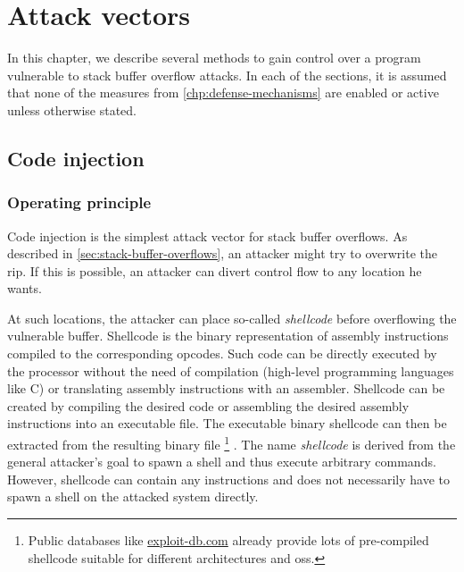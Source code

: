 \chapter{Attack vectors}
\label{chp:attack-vectors}

In this chapter, we describe several methods to gain control over a program vulnerable to stack buffer overflow attacks.
In each of the sections, it is assumed that none of the measures from \cref{chp:defense-mechanisms} are enabled or active unless otherwise stated.


\section{Code injection}
\label{sec:code-injection}

\subsection{Operating principle}
\label{subsec:ci-operating-principle}

Code injection is the simplest attack vector for stack buffer overflows.
As described in \cref{sec:stack-buffer-overflows}, an attacker might try to overwrite the \gls{rip}.
If this is possible, an attacker can divert control flow to any location he wants.

At such locations, the attacker can place so-called \emph{shellcode} before overflowing the vulnerable buffer.
Shellcode is the binary representation of assembly instructions compiled to the corresponding \glspl{opcode}.
Such code can be directly executed by the processor without the need of compilation (high-level programming languages like C) or translating assembly instructions with an assembler.
Shellcode can be created by compiling the desired code or assembling the desired assembly instructions into an executable file.
The executable binary shellcode can then be extracted from the resulting binary file%
	\footnote{Public databases like \href{https://www.exploit-db.com/shellcodes}{exploit-db.com} already provide lots of pre-compiled shellcode suitable for different architectures and \glspl{os}.}%
.
The name \emph{shellcode} is derived from the general attacker's goal to spawn a shell and thus execute arbitrary commands.
However, shellcode can contain any instructions and does not necessarily have to spawn a shell on the attacked system directly.

